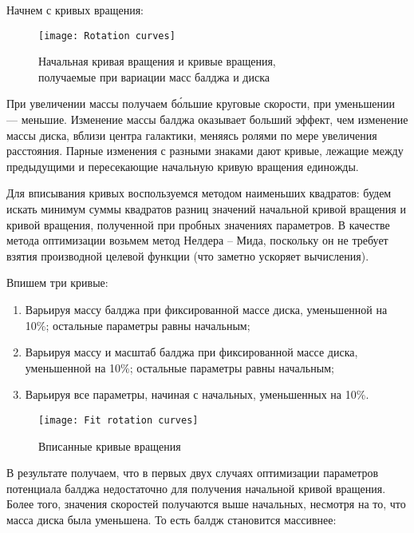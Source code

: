 \documentclass[a4paper, oneside]{article}
\begin{document}
Начнем с кривых вращения:

\captionsetup{justification=centering}

\begin{figure}[h!]
  \centering
  \texttt{[image: Rotation curves]}
  \caption{Начальная кривая вращения и кривые вращения, \\ получаемые при вариации масс балджа и диска}
\end{figure}

При увеличении массы получаем б\'ольшие круговые скорости, при уменьшении --- меньшие. Изменение массы балджа оказывает больший эффект, чем изменение массы диска, вблизи центра галактики, меняясь ролями по мере увеличения расстояния. Парные изменения с разными знаками дают кривые, лежащие между предыдущими и пересекающие начальную кривую вращения единожды.

\vspace{\baselineskip}

Для вписывания кривых воспользуемся методом наименьших квадратов: будем искать минимум суммы квадратов разниц значений начальной кривой вращения и кривой вращения, полученной при пробных значениях параметров. В качестве метода оптимизации возьмем метод Нелдера -- Мида, поскольку он не требует взятия производной целевой функции (что заметно ускоряет вычисления).

\vspace{\baselineskip}

Впишем три кривые:

\begin{enumerate}
  \setlength\itemsep{-0.1em}
  \item Варьируя массу балджа при фиксированной массе диска, уменьшенной на 10\%; остальные параметры равны начальным;
  \item Варьируя массу и масштаб балджа при фиксированной массе диска, уменьшенной на 10\%; остальные параметры равны начальным;
  \item Варьируя все параметры, начиная с начальных, уменьшенных на 10\%.
\end{enumerate}

\newpage

\begin{figure}[h!]
  \centering
  \texttt{[image: Fit rotation curves]}
  \caption{Вписанные кривые вращения}
\end{figure}

В результате получаем, что в первых двух случаях оптимизации параметров потенциала балджа недостаточно для получения начальной кривой вращения. Более того, значения скоростей получаются выше начальных, несмотря на то, что масса диска была уменьшена. То есть балдж становится массивнее:
\end{document}
